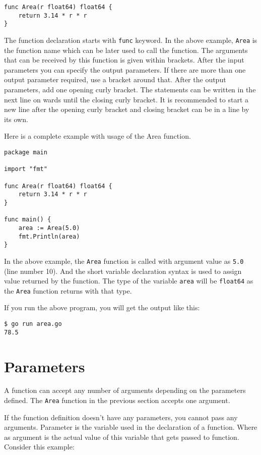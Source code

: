 \begin{lstlisting}[numbers=none]
func Area(r float64) float64 {
    return 3.14 * r * r
}
\end{lstlisting}

The function declaration starts with \texttt{func} keyword.  In the
above example, \texttt{Area} is the function name which can be later
used to call the function.  The arguments that can be received by this
function is given within brackets.  After the input parameters you can
specify the output parameters.  If there are more than one output
parameter required, use a bracket around that.  After the output
parameters, add one opening curly bracket.  The statements can be
written in the next line on wards until the closing curly bracket.  It
is recommended to start a new line after the opening curly bracket and
closing bracket can be in a line by its own.

Here is a complete example with usage of the Area function.

\begin{lstlisting}[caption=Function to calculate area of circle (area.go)]
package main

import "fmt"

func Area(r float64) float64 {
    return 3.14 * r * r
}

func main() {
    area := Area(5.0)
    fmt.Println(area)
}
\end{lstlisting}

In the above example, the \texttt{Area} function is called with
argument value as \texttt{5.0} (line number 10).  And the short
variable declaration syntax is used to assign value returned by the
function.  The type of the variable \texttt{area} will be
\texttt{float64} as the \texttt{Area} function returns with that type.

If you run the above program, you will get the output like this:

\begin{lstlisting}[numbers=none]
$ go run area.go
78.5
\end{lstlisting}

\section{Parameters}

A function can accept any number of arguments depending on the
parameters defined.  The \texttt{Area} function in the previous
section accepts one argument.

If the function definition doesn't have any parameters, you cannot
pass any arguments.  Parameter is the variable used
in the declaration of a function.  Where as
argument is the actual value of this
variable that gets passed to function.  Consider this example:

